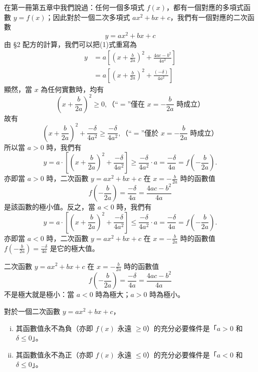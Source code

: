 在第一冊第五章中我們說過：任何一個多項式 $f(x)$，都有一個對應的多項式函數 $y=f(x)$；因此對於一個二次多項式 $ax^2+bx+c$，我們有一個對應的二次函數
\begin{equation}\label{eq:b2_quad_func}\tag{1}
y = ax^2+bx+c
\end{equation}
由 \S 2 配方的計算，我們可以把(1)式重寫為
\begin{align}
y &= a\left[\left(x+\frac{b}{2a}\right)^2 + \frac{4ac-b^2}{4a^2}\right] \nonumber \\
&= a\left[\left(x+\frac{b}{2a}\right)^2 + \frac{(-\delta)}{4a^2}\right] \tag{2}\label{eq:b2_quad_vertex}
\end{align}
顯然，當 $x$ 為任何實數時，均有
\begin{equation}\label{eq:b2_square_nonneg}\tag{3}
\left(x+\frac{b}{2a}\right)^2 \ge 0, \text{（``$=$''僅在 $x=-\frac{b}{2a}$ 時成立）}
\end{equation}
故有
\[
\left(x+\frac{b}{2a}\right)^2 + \frac{-\delta}{4a^2} \ge \frac{-\delta}{4a^2}, \text{（``$=$''僅於 $x=-\frac{b}{2a}$ 時成立）}
\]
所以當 $a > 0$ 時，我們有
\[
y = a\cdot \left[\left(x+\frac{b}{2a}\right)^2 + \frac{-\delta}{4a^2}\right] \ge \frac{-\delta}{4a^2}\cdot a = \frac{-\delta}{4a} = f\left(-\frac{b}{2a}\right).
\]
亦即當 $a>0$ 時，二次函數 $y=ax^2+bx+c$ 在 $x=-\frac{b}{2a}$ 時的函數值
\[
f\left(-\frac{b}{2a}\right) = \frac{-\delta}{4a} = \frac{4ac-b^2}{4a}
\]
是該函數的極小值。反之，當 $a<0$ 時，我們有
\[
y = a\cdot \left[\left(x+\frac{b}{2a}\right)^2 + \frac{-\delta}{4a^2}\right] \le \frac{-\delta}{4a^2}\cdot a = \frac{-\delta}{4a} = f\left(-\frac{b}{2a}\right).
\]
亦即當 $a<0$ 時，二次函數 $y=ax^2+bx+c$ 在 $x=-\frac{b}{2a}$ 時的函數值 $f\left(-\frac{b}{2a}\right) = \frac{-\delta}{4a}$ 是它的極大值。

\begin{theorem}\label{thm:b2_1-3}
二次函數 $y=ax^2+bx+c$ 在 $x=-\frac{b}{2a}$ 時的函數值
\[
f\left(-\frac{b}{2a}\right) = \frac{-\delta}{4a} = \frac{4ac-b^2}{4a}
\]
不是極大就是極小：當 $a<0$ 時為極大；$a>0$ 時為極小。
\end{theorem}

\begin{corollary}\label{cor:b2_1-3}
對於一個二次函數 $y=ax^2+bx+c$，
\begin{enumerate}[(i)]
  \item 其函數值永不為負（亦即 $f(x)$ 永遠 $\ge 0$）的充分必要條件是「$a>0$ 和 $\delta \le 0$」。
  \item 其函數值永不為正（亦即 $f(x)$ 永遠 $\le 0$）的充分必要條件是「$a<0$ 和 $\delta \le 0$」。
\end{enumerate}
\end{corollary}

